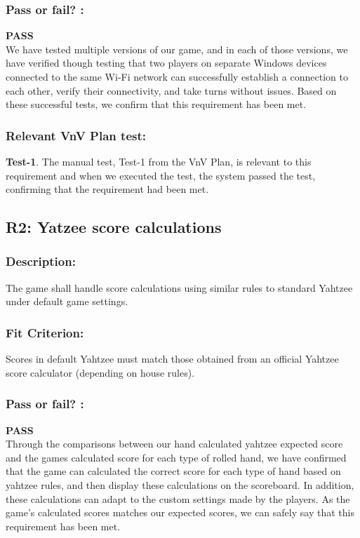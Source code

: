 \documentclass[12pt, titlepage]{article}
\begin{document}
 \subsubsection*{Pass or fail? :}
 
 \noindent \textbf{PASS}\\
 
 We have tested multiple versions of our game, and in each of those versions, we have verified though testing that two players on separate Windows devices connected to the same Wi-Fi network can successfully establish a connection to each other, verify their connectivity, and take turns without issues. Based on these successful tests, we confirm that this requirement has been met.
 
 \subsubsection*{Relevant VnV Plan test: }  
 
  \noindent \textbf{ Test-1}. The manual test, Test-1 from the VnV Plan, is relevant to this requirement and when we executed the test, the system passed the test, confirming that the requirement had been met.


\subsection{R2: Yatzee score calculations}
\label{R2} 
  
   \subsubsection*{Description:}  The game shall handle score calculations using similar rules to standard Yahtzee under default game settings.

 \subsubsection*{Fit Criterion:}  Scores in default Yahtzee must match those obtained from an official Yahtzee score calculator (depending on house rules).
 
 \subsubsection*{Pass or fail? :}
 
 \noindent \textbf{PASS}\\
 
 Through the comparisons between our hand calculated yahtzee  expected score and the games calculated score for each type of rolled hand, we have confirmed that the game can calculated the correct score for each type of hand based on yahtzee rules, and then display these calculations on the scoreboard. In addition, these calculations can adapt to the custom settings made by the players. As the game's calculated scores matches our expected scores, we can safely say that this requirement has been met. 
 
\end{document}
